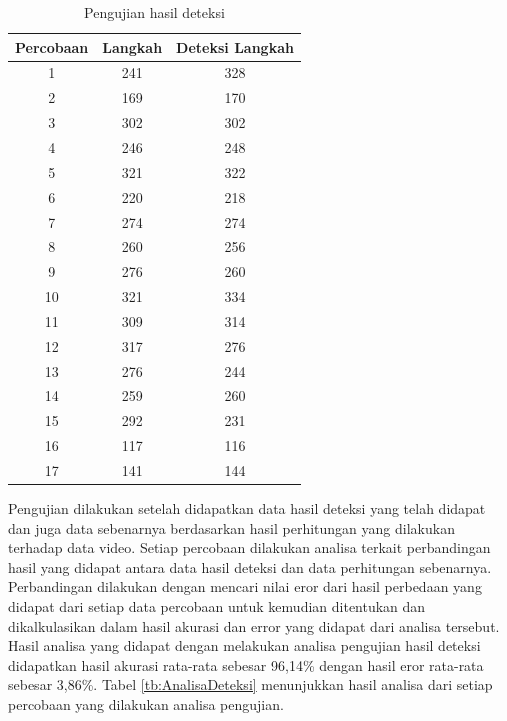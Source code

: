 \begin{longtable}{|c|c|c|}
  \caption{Pengujian hasil deteksi}
  \label{tb:PengujianDeteksi}                                   \\
  \hline
  \rowcolor[HTML]{C0C0C0}
  \textbf{Percobaan} & \textbf{Langkah} & \textbf{Deteksi Langkah} \\
  \hline
  1   & 241   & 328    \\
  \hline
  2   & 169   & 170    \\
  \hline
  3   & 302   & 302    \\
  \hline
  4   & 246   & 248    \\
  \hline
  5   & 321   & 322    \\
  \hline
  6   & 220   & 218    \\
  \hline
  7   & 274   & 274    \\
  \hline
  8   & 260   & 256    \\
  \hline
  9   & 276   & 260    \\
  \hline
  10   & 321   & 334    \\
  \hline
  11   & 309   & 314    \\
  \hline
  12   & 317   & 276    \\
  \hline
  13   & 276   & 244    \\
  \hline
  14   & 259   & 260    \\
  \hline
  15   & 292   & 231    \\
  \hline
  16   & 117   & 116    \\
  \hline
  17   & 141   & 144    \\
  \hline
\end{longtable}
\clearpage

Pengujian dilakukan setelah didapatkan data hasil deteksi yang telah didapat dan juga data sebenarnya berdasarkan hasil perhitungan yang dilakukan terhadap data video. Setiap percobaan dilakukan analisa terkait perbandingan hasil yang didapat antara data hasil deteksi dan data perhitungan sebenarnya. Perbandingan dilakukan dengan mencari nilai eror dari hasil perbedaan yang didapat dari setiap data percobaan untuk kemudian ditentukan dan dikalkulasikan dalam hasil akurasi dan error yang didapat dari analisa tersebut. Hasil analisa yang didapat dengan melakukan analisa pengujian hasil deteksi didapatkan hasil akurasi rata-rata sebesar 96,14\% dengan hasil eror rata-rata sebesar 3,86\%. Tabel \ref{tb:AnalisaDeteksi} menunjukkan hasil analisa dari setiap percobaan yang dilakukan analisa pengujian.

